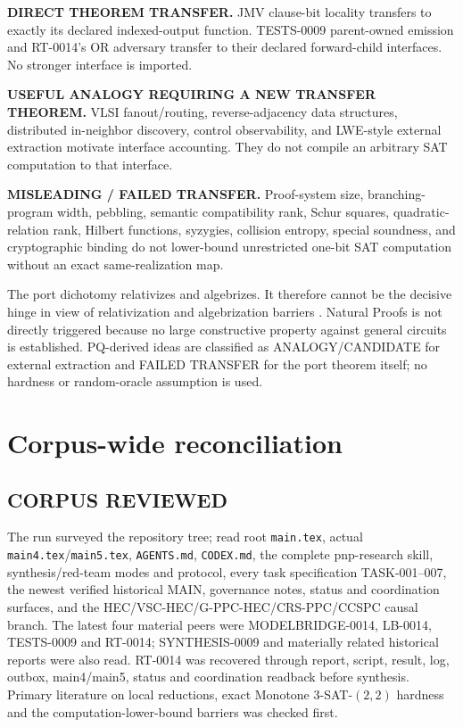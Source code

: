 \documentclass[11pt]{article}
\begin{document}
\begin{description}[leftmargin=0cm,labelwidth=0cm]
\item[] \textbf{DIRECT THEOREM TRANSFER.}
JMV clause-bit locality transfers to exactly its declared indexed-output
function.  TESTS-0009 parent-owned emission and RT-0014's OR adversary
transfer to their declared forward-child interfaces.  No stronger interface
is imported.
\item[] \textbf{USEFUL ANALOGY REQUIRING A NEW TRANSFER THEOREM.}
VLSI fanout/routing, reverse-adjacency data structures, distributed
in-neighbor discovery, control observability, and LWE-style external
extraction motivate interface accounting.  They do not compile an arbitrary
SAT computation to that interface.
\item[] \textbf{MISLEADING / FAILED TRANSFER.}
Proof-system size, branching-program width, pebbling, semantic compatibility
rank, Schur squares, quadratic-relation rank, Hilbert functions, syzygies,
collision entropy, special soundness, and cryptographic binding do not
lower-bound unrestricted one-bit SAT computation without an exact
same-realization map.
\end{description}

The port dichotomy relativizes and algebrizes.  It therefore cannot be the
decisive hinge in view of relativization and algebrization barriers
\cite{bgs,aw}.  Natural Proofs is not directly triggered because no large
constructive property against general circuits is established.  PQ-derived
ideas are classified as ANALOGY/CANDIDATE for external extraction and FAILED
TRANSFER for the port theorem itself; no hardness or random-oracle assumption
is used.

\section{Corpus-wide reconciliation}

\subsection*{CORPUS REVIEWED}
The run surveyed the repository tree; read root \texttt{main.tex}, actual
\texttt{main4.tex}/\texttt{main5.tex}, \texttt{AGENTS.md},
\texttt{CODEX.md}, the complete pnp-research skill, synthesis/red-team modes
and protocol, every task specification TASK-001--007, the newest verified
historical MAIN, governance notes, status and coordination surfaces, and the
HEC/VSC-HEC/G-PPC-HEC/CRS-PPC/CCSPC causal branch.  The latest four
material peers were MODELBRIDGE-0014, LB-0014, TESTS-0009 and RT-0014;
SYNTHESIS-0009 and materially related historical reports were also read.
RT-0014 was recovered through report, script, result, log, outbox,
main4/main5, status and coordination readback before synthesis.  Primary
literature on local reductions, exact Monotone 3-SAT-$(2,2)$ hardness and
the computation-lower-bound barriers was checked first.
\end{document}
